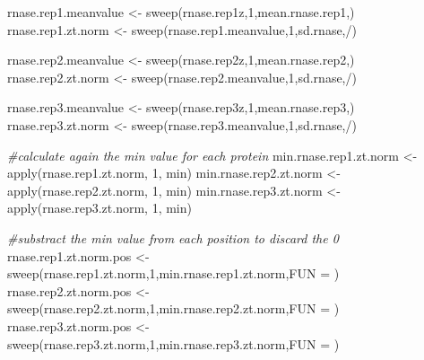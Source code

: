 \documentclass[
]{article}
\newenvironment{Shaded}{\begin{snugshade}}{\end{snugshade}}
\newcommand{\AttributeTok}[1]{\textcolor[rgb]{0.77,0.63,0.00}{#1}}
\newcommand{\CommentTok}[1]{\textcolor[rgb]{0.56,0.35,0.01}{\textit{#1}}}
\newcommand{\DecValTok}[1]{\textcolor[rgb]{0.00,0.00,0.81}{#1}}
\newcommand{\FunctionTok}[1]{\textcolor[rgb]{0.00,0.00,0.00}{#1}}
\newcommand{\NormalTok}[1]{#1}
\newcommand{\OtherTok}[1]{\textcolor[rgb]{0.56,0.35,0.01}{#1}}
\newcommand{\StringTok}[1]{\textcolor[rgb]{0.31,0.60,0.02}{#1}}
\begin{document}
\begin{Shaded}
\begin{Highlighting}[]
\NormalTok{rnase.rep1.meanvalue }\OtherTok{\textless{}{-}} \FunctionTok{sweep}\NormalTok{(rnase.rep1z,}\DecValTok{1}\NormalTok{,mean.rnase.rep1,}\StringTok{\textquotesingle{}{-}\textquotesingle{}}\NormalTok{)}
\NormalTok{rnase.rep1.zt.norm }\OtherTok{\textless{}{-}} \FunctionTok{sweep}\NormalTok{(rnase.rep1.meanvalue,}\DecValTok{1}\NormalTok{,sd.rnase,}\StringTok{\textquotesingle{}/\textquotesingle{}}\NormalTok{)}

\NormalTok{rnase.rep2.meanvalue }\OtherTok{\textless{}{-}} \FunctionTok{sweep}\NormalTok{(rnase.rep2z,}\DecValTok{1}\NormalTok{,mean.rnase.rep2,}\StringTok{\textquotesingle{}{-}\textquotesingle{}}\NormalTok{)}
\NormalTok{rnase.rep2.zt.norm }\OtherTok{\textless{}{-}} \FunctionTok{sweep}\NormalTok{(rnase.rep2.meanvalue,}\DecValTok{1}\NormalTok{,sd.rnase,}\StringTok{\textquotesingle{}/\textquotesingle{}}\NormalTok{)}

\NormalTok{rnase.rep3.meanvalue }\OtherTok{\textless{}{-}} \FunctionTok{sweep}\NormalTok{(rnase.rep3z,}\DecValTok{1}\NormalTok{,mean.rnase.rep3,}\StringTok{\textquotesingle{}{-}\textquotesingle{}}\NormalTok{)}
\NormalTok{rnase.rep3.zt.norm }\OtherTok{\textless{}{-}} \FunctionTok{sweep}\NormalTok{(rnase.rep3.meanvalue,}\DecValTok{1}\NormalTok{,sd.rnase,}\StringTok{\textquotesingle{}/\textquotesingle{}}\NormalTok{)}

\CommentTok{\#calculate again the min value for each protein}
\NormalTok{min.rnase.rep1.zt.norm }\OtherTok{\textless{}{-}} \FunctionTok{apply}\NormalTok{(rnase.rep1.zt.norm, }\DecValTok{1}\NormalTok{, min)}
\NormalTok{min.rnase.rep2.zt.norm }\OtherTok{\textless{}{-}} \FunctionTok{apply}\NormalTok{(rnase.rep2.zt.norm, }\DecValTok{1}\NormalTok{, min)}
\NormalTok{min.rnase.rep3.zt.norm }\OtherTok{\textless{}{-}} \FunctionTok{apply}\NormalTok{(rnase.rep3.zt.norm, }\DecValTok{1}\NormalTok{, min)}

\CommentTok{\#substract the min value from each position to discard the 0}
\NormalTok{rnase.rep1.zt.norm.pos }\OtherTok{\textless{}{-}} \FunctionTok{sweep}\NormalTok{(rnase.rep1.zt.norm,}\DecValTok{1}\NormalTok{,min.rnase.rep1.zt.norm,}\AttributeTok{FUN =} \StringTok{\textquotesingle{}{-}\textquotesingle{}}\NormalTok{)}
\NormalTok{rnase.rep2.zt.norm.pos }\OtherTok{\textless{}{-}} \FunctionTok{sweep}\NormalTok{(rnase.rep2.zt.norm,}\DecValTok{1}\NormalTok{,min.rnase.rep2.zt.norm,}\AttributeTok{FUN =} \StringTok{\textquotesingle{}{-}\textquotesingle{}}\NormalTok{)}
\NormalTok{rnase.rep3.zt.norm.pos }\OtherTok{\textless{}{-}} \FunctionTok{sweep}\NormalTok{(rnase.rep3.zt.norm,}\DecValTok{1}\NormalTok{,min.rnase.rep3.zt.norm,}\AttributeTok{FUN =} \StringTok{\textquotesingle{}{-}\textquotesingle{}}\NormalTok{)}
\end{Highlighting}
\end{Shaded}
\end{document}
